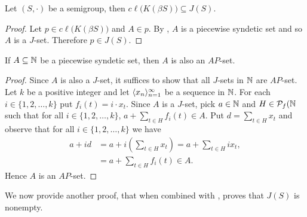 \begin{cor}
  Let $(S, \cdot)$ be a semigroup, then $c\ell\bigl( K(\beta S) \bigr) \subseteq J(S)$.
\end{cor}
\begin{proof}
  Let $p \in c\ell\bigl( K(\beta S) \bigr)$ and $A \in p$.
  By \cite[Corollary 4.41]{Hindman:1998fk}, $A$ is a piecewise syndetic set and so $A$ is a $J$-set.
  Therefore $p \in J(S)$.
\end{proof}

\begin{cor}
  If $A \subseteq \mathbb{N}$ be a piecewise syndetic set, then $A$ is also an $AP$-set. 
\end{cor}
\begin{proof}
  Since $A$ is also a $J$-set, it suffices to show that all $J$-sets in $\mathbb{N}$ are $AP$-set. 
  Let $k$ be a positive integer and let $\langle x_n \rangle_{n=1}^\infty$ be a sequence in $\mathbb{N}$. 
  For each $i \in \{1, 2, \ldots, k\}$ put $f_i(t) = i \cdot x_t$.
  Since $A$ is a $J$-set, pick $a \in \mathbb{N}$ and $H \in \mathcal{P}_f(\mathbb{N}$ such that for all $i \in \{1, 2, \ldots, k\}$, $a + \sum_{t \in H} f_i(t) \in A$. 
  Put $d = \sum_{t \in H} x_t$ and observe that for all $i \in \{1, 2, \ldots, k\}$ we have
  \begin{align*}
    a+id &= \textstyle a+ i(\sum_{t \in H} x_t) = a + \sum_{t \in H} ix_t, \\
    &= \textstyle a + \sum_{t \in H} f_i(t) \in A. 
  \end{align*}
  Hence $A$ is an $AP$-set.
\end{proof}

We now provide another proof, that when combined with \cite[Theorem 3.11]{Hindman:1998fk}, proves that $J(S)$ is nonempty.

